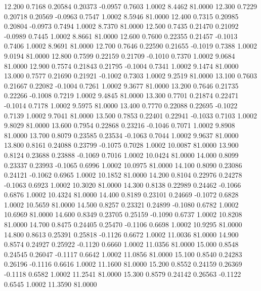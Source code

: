   12.200   0.7168   0.20584   0.20373  -0.0957   0.7603   1.0002   8.4462  81.0000
  12.300   0.7229   0.20718   0.20569  -0.0963   0.7547   1.0002   8.5946  81.0000
  12.400   0.7315   0.20985   0.20804  -0.0973   0.7494   1.0002   8.7370  81.0000
  12.500   0.7435   0.21470   0.21092  -0.0989   0.7445   1.0002   8.8661  81.0000
  12.600   0.7600   0.22355   0.21457  -0.1013   0.7406   1.0002   8.9691  81.0000
  12.700   0.7646   0.22590   0.21655  -0.1019   0.7388   1.0002   9.0194  81.0000
  12.800   0.7599   0.22159   0.21709  -0.1010   0.7370   1.0002   9.0684  81.0000
  12.900   0.7574   0.21843   0.21795  -0.1004   0.7341   1.0002   9.1474  81.0000
  13.000   0.7577   0.21690   0.21921  -0.1002   0.7303   1.0002   9.2519  81.0000
  13.100   0.7603   0.21667   0.22082  -0.1004   0.7261   1.0002   9.3677  81.0000
  13.200   0.7646   0.21735   0.22266  -0.1008   0.7219   1.0002   9.4845  81.0000
  13.300   0.7701   0.21874   0.22471  -0.1014   0.7178   1.0002   9.5975  81.0000
  13.400   0.7770   0.22088   0.22695  -0.1022   0.7139   1.0002   9.7041  81.0000
  13.500   0.7853   0.22401   0.22941  -0.1033   0.7103   1.0002   9.8029  81.0000
  13.600   0.7954   0.22868   0.23216  -0.1046   0.7071   1.0002   9.8908  81.0000
  13.700   0.8079   0.23585   0.23534  -0.1063   0.7044   1.0002   9.9637  81.0000
  13.800   0.8161   0.24088   0.23799  -0.1075   0.7028   1.0002  10.0087  81.0000
  13.900   0.8124   0.23688   0.23888  -0.1069   0.7016   1.0002  10.0424  81.0000
  14.000   0.8099   0.23337   0.23993  -0.1065   0.6996   1.0002  10.0975  81.0000
  14.100   0.8090   0.23086   0.24121  -0.1062   0.6965   1.0002  10.1852  81.0000
  14.200   0.8104   0.22976   0.24278  -0.1063   0.6923   1.0002  10.3020  81.0000
  14.300   0.8138   0.22989   0.24462  -0.1066   0.6876   1.0002  10.4324  81.0000
  14.400   0.8189   0.23101   0.24669  -0.1072   0.6828   1.0002  10.5659  81.0000
  14.500   0.8257   0.23321   0.24899  -0.1080   0.6782   1.0002  10.6969  81.0000
  14.600   0.8349   0.23705   0.25159  -0.1090   0.6737   1.0002  10.8208  81.0000
  14.700   0.8475   0.24405   0.25470  -0.1106   0.6698   1.0002  10.9295  81.0000
  14.800   0.8613   0.25391   0.25818  -0.1126   0.6672   1.0002  11.0036  81.0000
  14.900   0.8574   0.24927   0.25922  -0.1120   0.6660   1.0002  11.0356  81.0000
  15.000   0.8548   0.24545   0.26047  -0.1117   0.6642   1.0002  11.0856  81.0000
  15.100   0.8540   0.24283   0.26196  -0.1116   0.6616   1.0002  11.1600  81.0000
  15.200   0.8552   0.24159   0.26369  -0.1118   0.6582   1.0002  11.2541  81.0000
  15.300   0.8579   0.24142   0.26563  -0.1122   0.6545   1.0002  11.3590  81.0000
